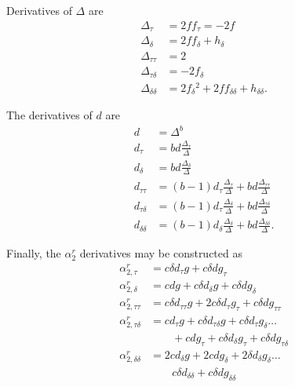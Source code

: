 Derivatives of $\Delta$ are
\begin{subequations}
\begin{align}
\Delta_{\tau} &= 2 f f_\tau = -2 f\\
\Delta_{\delta} &= 2 f f_\delta + h_\delta\\
\Delta_{\tau\tau} &= 2\\
\Delta_{\tau\delta} &= -2 f_\delta\\
\Delta_{\delta\delta} &= 2 f_\delta{^2} + 2 f f_{\delta\delta} + h_{\delta\delta}.
\end{align}
\end{subequations}

The derivatives of $d$ are
\begin{subequations}
\begin{align}
d &= \Delta^b\\
d_{\tau} &= b d \frac{\Delta_\tau}{\Delta}\\
d_{\delta} &= b d \frac{\Delta_\delta}{\Delta}\\
d_{\tau\tau} &= (b-1) d_\tau \frac{\Delta_{\tau}}{\Delta} + b d \frac{\Delta_{\tau\tau}}{\Delta}\\
d_{\tau\delta} &= (b-1) d_\tau \frac{\Delta_{\delta}}{\Delta} + b d \frac{\Delta_{\tau\delta}}{\Delta}\\
d_{\delta\delta} &= (b-1) d_\delta \frac{\Delta_{\delta}}{\Delta} + b d \frac{\Delta_{\delta\delta}}{\Delta}.
\end{align}
\end{subequations}

Finally, the $\alpha_2^r$ derivatives may be constructed as
\begin{subequations}
\begin{align}
\alpha^r_{2,\tau} &= c \delta d_\tau g + c \delta d g_\tau\\
\alpha^r_{2,\delta} &= c d g + c \delta d_\delta g + c \delta d g_\delta\\
\alpha^r_{2,\tau\tau} &= c \delta d_{\tau\tau} g + 2 c \delta d_\tau g_\tau + c \delta d g_{\tau\tau}\\
\alpha^r_{2,\tau\delta} &= c d_\tau g + c \delta d_{\tau\delta} g + c \delta d_\tau g_\delta \ldots\nonumber\\
  &\hspace{2em} + c d g_\tau + c \delta d_\delta g_\tau + c \delta d g_{\tau\delta}\\
\alpha^r_{2,\delta\delta} &= 2 c d_\delta g + 2 c d g_\delta + 2 \delta d_\delta g_\delta \ldots\nonumber\\
  &\hspace{2em} c \delta d_{\delta\delta} + c \delta d g_{\delta\delta}
\end{align}
\end{subequations}

